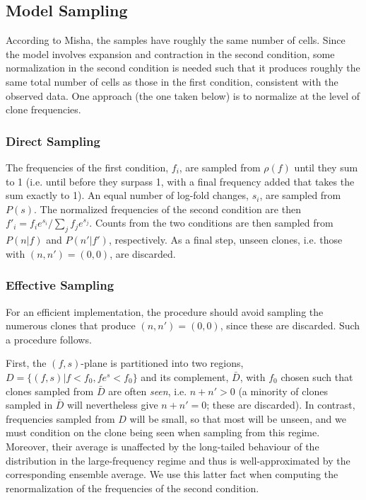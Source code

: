 \documentclass[letterpaper,english,prl,reprint,onecolumn]{revtex4-1} %
\begin{document}
\subsection*{Model Sampling}
According to Misha, the samples have roughly the same number of cells. Since the model involves expansion and contraction in the second condition, some normalization in the second condition is needed such that it produces roughly the same total number of cells as those in the first condition, consistent with the observed data. One approach (the one taken below) is to normalize at the level of clone frequencies. 

\subsubsection*{Direct Sampling}
The frequencies of the first condition, $f_i$, are sampled from $\rho(f)$ until they sum to 1 (i.e. until before they surpass 1, with a final frequency added that takes the sum exactly to 1). An equal number of log-fold changes, $s_i$, are sampled from $P(s)$. The normalized frequencies of the second condition are then $f'_i=f_ie^{s_i}/\sum_j f_je^{s_j}$.  Counts from the two conditions are then sampled from $P(n|f)$ and $P(n'|f')$, respectively. As a final step, unseen clones, i.e. those with $(n,n')=(0,0)$, are discarded.

\subsubsection*{Effective Sampling}
For an efficient implementation, the procedure should avoid sampling the numerous clones that produce $(n,n')=(0,0)$, since these are discarded. Such a procedure follows. 

First, the $(f,s)$-plane is partitioned into two regions, $D=\{(f,s)|f<f_0,fe^s<f_0\}$ and its complement, $\bar D$, with $f_0$ chosen such that clones sampled from $\bar D$ are often \textit{seen}, i.e. $n+n'>0$ (a minority of clones sampled in $\bar D$ will nevertheless give $n+n'=0$; these are discarded). In contrast, frequencies sampled from $D$ will be small, so that most will be unseen, and we must condition on the clone being seen when sampling from this regime. Moreover, their average is unaffected by the long-tailed behaviour of the distribution in the large-frequency regime and thus is well-approximated by the corresponding ensemble average. We use this latter fact when computing the renormalization of the frequencies of the second condition. 
\end{document}
